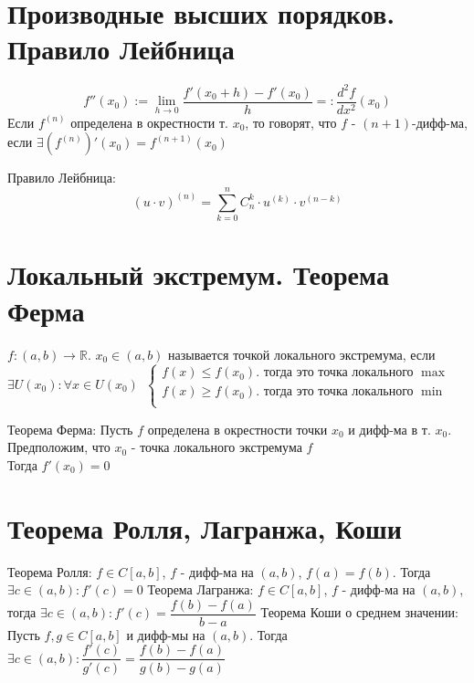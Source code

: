 \documentclass[11pt, a4paper]{article}
\def\R{\mathbb{R}}
\def\sp{\, \, \,}
\begin{document}
    \section{Производные высших порядков. Правило Лейбница}
    $$f''(x_0) := \lim_{h \to 0} \frac{f'(x_0 + h)-f'(x_0)}{h} =: \frac{d^2f}{dx^2}(x_0)$$
    Если $f^{(n)}$ определена в окрестности т. $x_0$, то говорят, что $f$ - $(n+1)$-дифф-ма, если $\exists (f^{(n)})'(x_0) = f^{(n+1)}(x_0)$

    Правило Лейбница:
    $$(u \cdot v)^{(n)} = \sum_{k = 0}^n C_n^k \cdot u^{(k)} \cdot v^{(n-k)}$$

    \section{Локальный экстремум. Теорема Ферма}
    $f: (a,b) \to \R$. $x_0 \in (a,b)$ называется точкой локального экстремума, если $\exists U(x_0) : \forall x \in U(x_0) \sp \begin{cases}
        f(x) \leq f(x_0) \text{. тогда это точка локального } \max \\
        f(x) \geq f(x_0) \text{. тогда это точка локального } \min \\
    \end{cases}$

    Теорема Ферма: Пусть $f$ определена в окрестности точки $x_0$ и дифф-ма в т. $x_0$. Предположим, что $x_0$ - точка локального экстремума $f$\\
    Тогда $f'(x_0) = 0$
    
    \section{Теорема Ролля, Лагранжа, Коши}
    Теорема Ролля: $f \in C[a,b]$, $f$ - дифф-ма на $(a,b)$, $f(a) = f(b)$. Тогда $\exists c \in (a,b): f'(c) = 0$
    Теорема Лагранжа: $f \in C[a,b]$, $f$ - дифф-ма на $(a,b)$, тогда $\exists c \in (a,b): f'(c) = \dfrac{f(b) - f(a)}{b-a}$
    Теорема Коши о среднем значении: Пусть $f, g \in C[a,b]$ и дифф-мы на $(a,b)$. Тогда $\exists c \in (a,b): \dfrac{f'(c)}{g'(c)} = \dfrac{f(b) - f(a)}{g(b) - g(a)}$
    
\end{document}
